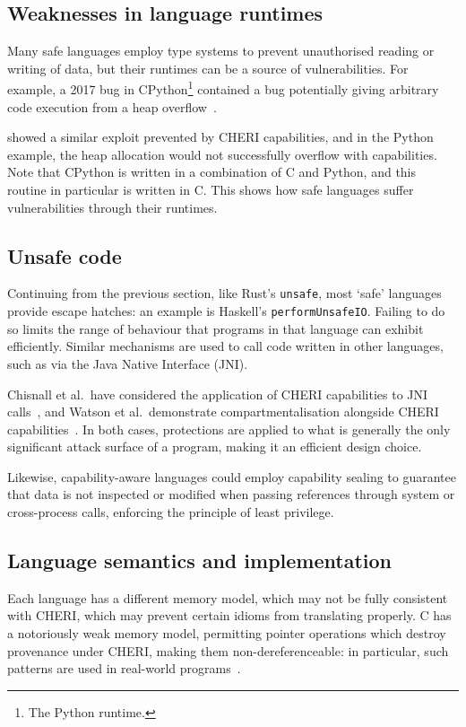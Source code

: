 \documentclass[dissertation.tex]{subfiles}
\begin{document}
\subsection{Weaknesses in language runtimes}
Many safe languages employ type systems to prevent unauthorised reading
or writing of data, but their runtimes can be a source of
vulnerabilities.
For example, a 2017 bug in CPython\footnote{The Python runtime.}
contained a bug potentially giving arbitrary code execution from a heap
overflow~\cite{cpython-overflow}.

 showed a similar exploit prevented by CHERI
capabilities, and in the Python example, the heap allocation would not
successfully overflow with capabilities.
Note that CPython is written in a combination of C and Python, and this
routine in particular is written in C.
This shows how safe languages suffer vulnerabilities through their
runtimes.


\subsection{Unsafe code}
Continuing from the previous section, like Rust's \texttt{unsafe}, most
`safe' languages provide escape hatches: an example is Haskell's
\texttt{performUnsafeIO}.
Failing to do so limits the range of behaviour that programs in that
language can exhibit efficiently.
Similar mechanisms are used to call code written in other languages,
such as via the Java Native Interface (JNI).

Chisnall et al.\ have considered the application of CHERI capabilities
to JNI calls~\cite{cheri-jni}, and Watson et al.\ demonstrate
compartmentalisation alongside CHERI capabilities~\cite{cheri2015}.
In both cases, protections are applied to what is generally the only
significant attack surface of a program, making it an efficient design
choice.

Likewise, capability-aware languages could employ capability sealing to
guarantee that data is not inspected or modified when passing references
through system or cross-process calls, enforcing the principle of least
privilege.


\subsection{Language semantics and implementation}
Each language has a different memory model, which may not be fully
consistent with CHERI, which may prevent certain idioms from translating
properly.
C has a notoriously weak memory model, permitting pointer operations
which destroy provenance under CHERI, making them non-dereferenceable:
in particular, such patterns are used in real-world
programs~\cite{memarian2016cdepths}.
\end{document}

